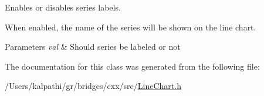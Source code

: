 Enables or disables series labels. 

When enabled, the name of the series will be shown on the line chart.


\begin{DoxyParams}{Parameters}
{\em val} & Should series be labeled or not \\
\hline
\end{DoxyParams}


The documentation for this class was generated from the following file\+:\begin{DoxyCompactItemize}
\item 
/\+Users/kalpathi/gr/bridges/cxx/src/\mbox{\hyperlink{_line_chart_8h}{Line\+Chart.\+h}}\end{DoxyCompactItemize}
